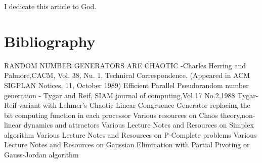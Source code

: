 \documentclass[11pt,onecolumn]{article}
\begin{document}
I dedicate this article to God.

\section{Bibliography}
\begin{thebibliography}{99}
 RANDOM NUMBER GENERATORS ARE CHAOTIC -Charles Herring and Palmore,CACM, Vol. 38, Nu. 1, Technical Correspondence. (Appeared in ACM SIGPLAN Notices, 11, October 1989)
 Efficient Parallel Pseudorandom number generation - Tygar and Reif, SIAM journal of computing,Vol 17 No.2,1988
 Tygar-Reif variant with Lehmer's Chaotic Linear Congruence Generator replacing the bit computing function in each processor
 Various resources on Chaos theory,non-linear dynamics and attractors
 Various Lecture Notes and Resources on Simplex algorithm 
 Various Lecture Notes and Resources on P-Complete problems
 Various Lecture Notes and Resources on Gaussian Elimination with Partial Pivoting or Gauss-Jordan algorithm
\end{thebibliography}
\end{document}
